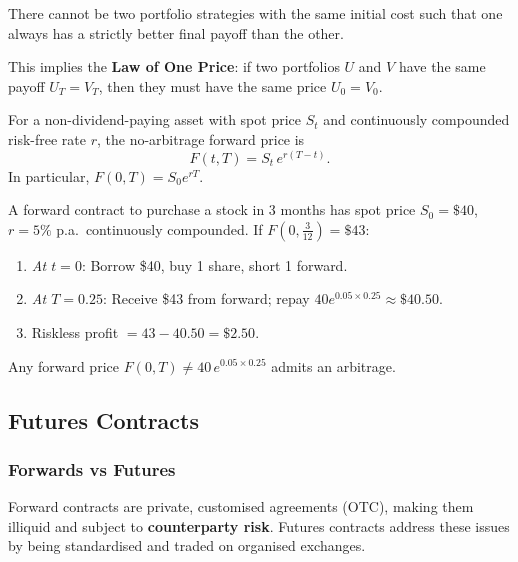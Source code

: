 \begin{definition}
  There cannot be two portfolio strategies with the same initial cost such that one always has a strictly better final payoff than the other.

  \medskip \noindent This implies the \textbf{Law of One Price}: if two portfolios $U$ and $V$ have the same payoff $U_T = V_T$, then they must have the same price $U_0 = V_0$.
\end{definition}

\begin{theorem}
  For a non-dividend-paying asset with spot price $S_t$ and continuously compounded risk-free rate $r$, the no-arbitrage forward price is
  \[
    F(t,T) = S_t \, e^{r(T-t)}.
  \]
  In particular, $F(0,T) = S_0 e^{rT}$.
\end{theorem}

\begin{example}[Arbitrage]
  A forward contract to purchase a stock in 3 months has spot price $S_0 = \$40$, $r = 5\%$ p.a.\ continuously compounded. If $F(0, \tfrac{3}{12}) = \$43$:
  \begin{enumerate}
    \item \emph{At $t=0$}: Borrow \$40, buy 1 share, short 1 forward.
    \item \emph{At $T=0.25$}: Receive \$43 from forward; repay $40 e^{0.05 \times 0.25} \approx \$40.50$.
    \item Riskless profit $= 43 - 40.50 = \$2.50$.
  \end{enumerate}
  Any forward price $F(0,T) \neq 40\,e^{0.05 \times 0.25}$ admits an arbitrage.
\end{example}

\subsection{Futures Contracts}

\subsubsection*{Forwards vs Futures}

Forward contracts are private, customised agreements (OTC), making them illiquid and subject to \textbf{counterparty risk}. Futures contracts address these issues by being standardised and traded on organised exchanges.

